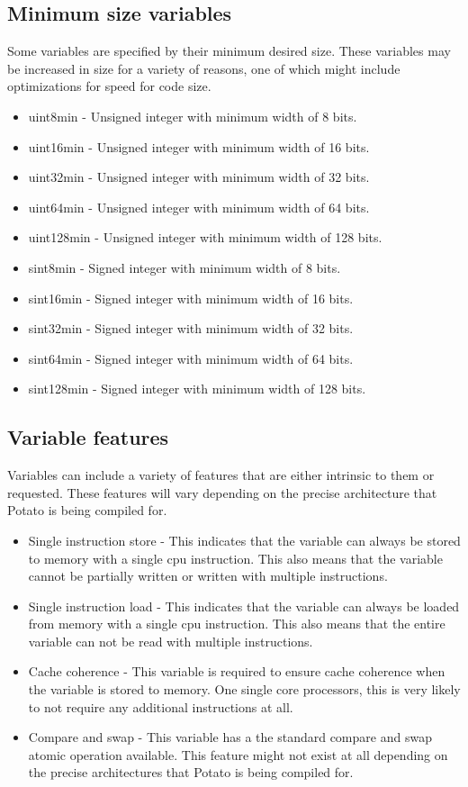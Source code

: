 \documentclass[12pt]{article}
\newcommand{\progLangNameSpace}{Potato }
\begin{document}
\subsection{Minimum size variables}

Some variables are specified by their minimum desired size. These variables may be increased in size for a variety of reasons, one of which might include optimizations for speed for code size.

\begin{itemize}
\item uint8min - Unsigned integer with minimum width of 8 bits.
\item uint16min - Unsigned integer with minimum width of 16 bits.
\item uint32min - Unsigned integer with minimum width of 32 bits.
\item uint64min - Unsigned integer with minimum width of 64 bits.
\item uint128min - Unsigned integer with minimum width of 128 bits.
\item sint8min - Signed integer with minimum width of 8 bits.
\item sint16min - Signed integer with minimum width of 16 bits.
\item sint32min - Signed integer with minimum width of 32 bits.
\item sint64min - Signed integer with minimum width of 64 bits.
\item sint128min - Signed integer with minimum width of 128 bits.
\end{itemize}

\subsection{Variable features}

Variables can include a variety of features that are either intrinsic to them or requested. These features will vary depending on the precise architecture that \progLangNameSpace is being compiled for.

\begin{itemize}
\item Single instruction store - This indicates that the variable can always be stored to memory with a single cpu instruction. This also means that the variable cannot be partially written or written with multiple instructions.
\item Single instruction load - This indicates that the variable can always be loaded from memory with a single cpu instruction. This also means that the entire variable can not be read with multiple instructions.
\item Cache coherence - This variable is required to ensure cache coherence when the variable is stored to memory. One single core processors, this is very likely to not require any additional instructions at all.
\item Compare and swap - This variable has a the standard compare and swap atomic operation available. This feature might not exist at all depending on the precise architectures that \progLangNameSpace is being compiled for.
\end{itemize}
\end{document}
